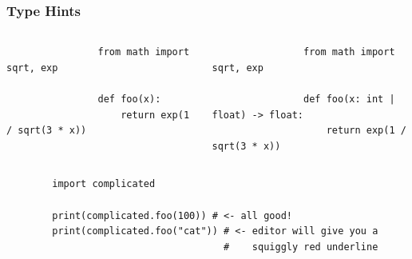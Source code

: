 \documentclass{ali-presentation}
\begin{document}
\begin{frame}[fragile, t]
    \frametitle{Type Hints}

    \begin{columns}[t]
        \begin{column}{.5\textwidth}
            \begin{verbatim}
                from math import sqrt, exp

                def foo(x):
                    return exp(1 / sqrt(3 * x))
            \end{verbatim}
        \end{column}
        \pause
        \begin{column}{.5\textwidth}
            \begin{verbatim}
                from math import sqrt, exp

                def foo(x: int | float) -> float:
                    return exp(1 / sqrt(3 * x))
            \end{verbatim}
        \end{column}
    \end{columns}

    \pause \bigskip

    \begin{verbatim}
        import complicated
        
        print(complicated.foo(100)) # <- all good!
        print(complicated.foo("cat")) # <- editor will give you a
                                      #    squiggly red underline
    \end{verbatim}
\end{frame}
\end{document}
